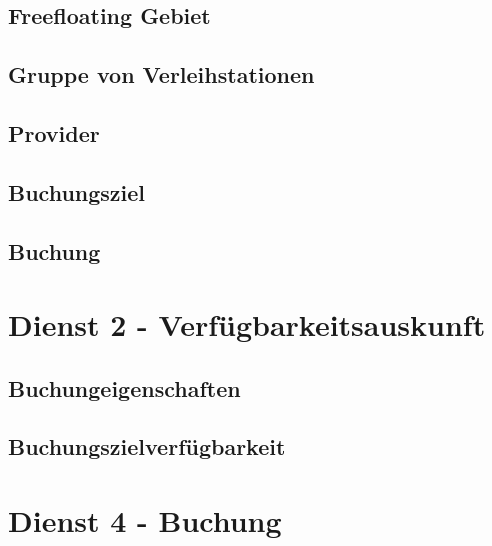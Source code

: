 \subsection*{Freefloating Gebiet}



\subsection*{Gruppe von Verleihstationen}



\subsection*{Provider}



\subsection*{Buchungsziel}



\subsection*{Buchung}



\section{Dienst 2 - Verfügbarkeitsauskunft}
\label{sec:Datenmodell:Dienst2}

\subsection*{Buchungeigenschaften}



\subsection*{Buchungszielverfügbarkeit}



\section{Dienst 4 - Buchung}
\label{sec:Datenmodell:Dienst4}

